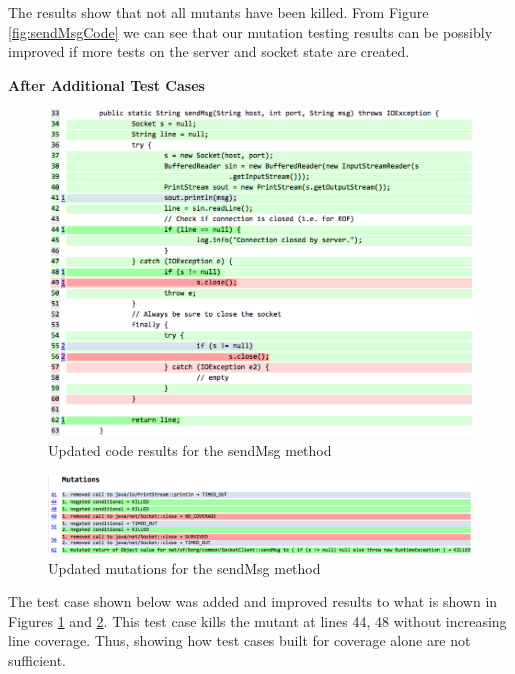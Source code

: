 \documentclass[fontsize=12pt,paper=letter,twoside]{scrartcl}
\begin{document}
\clearpage
The results show that not all mutants have been killed. From Figure \ref{fig:sendMsgCode} we can see that our mutation testing results can be possibly improved if more tests on the server and socket state are created. 

\bigskip

\fontsize{14}{5}\textbf{After Additional Test Cases}

\begin{figure}[!htb]
\begin{center}
\includegraphics[width=.99\textwidth]{images/MutationTesting/sendMsgCodeAfter.png}
\end{center}
\caption{Updated code results for the sendMsg method}
\label{fig:sendMsgCodeAfter}
\end{figure}

\begin{figure}[!htb]
\begin{center}
\includegraphics[width=.99\textwidth]{images/MutationTesting/sendMsgMutantAfter.png}
\end{center}
\caption{Updated mutations for the sendMsg method}
\label{fig:sendMsgMutantAfter}
\end{figure}

The test case shown below was added and improved results to what is shown in Figures \ref{fig:sendMsgCodeAfter} and \ref{fig:sendMsgMutantAfter}. This test case kills the mutant at lines 44, 48 without increasing line coverage. Thus, showing how test cases built for coverage alone are not sufficient. \\
\end{document}
